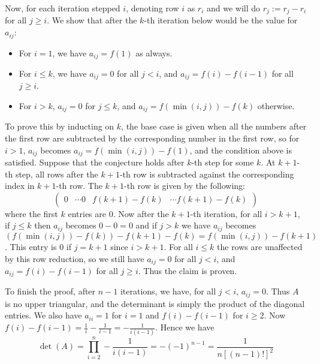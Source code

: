 \documentclass[11pt,a4paper]{article}
\begin{document}
\begin{enumerate}
	Now, for each iteration stepped $i$, denoting row $i$ as $r_i$ and we will do $r_{j}:=r_{j}-r_i$ for all $j\ge i$. We show that after the $k$-th iteration below would be the value for $a_{ij}$: 
	\begin{itemize}
		\item For $i=1$, we have $a_{ij}=f(1)$ as always. 
		\item For $i\le k$, we have $a_{ij}=0$ for all $j<i$, and $a_{ij}=f(i)-f(i-1)$ for all $j\ge i$. 
		\item For $i>k$, $a_{ij}=0$ for $j\le k$, and $a_{ij}=f(\min(i, j))-f(k)$ otherwise. 
	\end{itemize}
    To prove this by inducting on $k$, the base case is given when all the numbers after the first row are subtracted by the corresponding number in the first row, so for $i>1$, $a_{ij}$ becomes $a_{ij}=f(\min(i, j))-f(1)$, and the condition above is satisfied. Suppose that the conjecture holds after $k$-th step for some $k$. At $k+1$-th step, all rows after the $k+1$-th row is subtracted against the corresponding index in $k+1$-th row. The $k+1$-th row is given by the following: 
    \[\begin{pmatrix}0 & \cdots 0 & f(k+1)-f(k) & \cdots f(k+1)-f(k)\end{pmatrix}\]
    where the first $k$ entries are 0. Now after the $k+1$-th iteration, for all $i>k+1$, if $j\le k$ then $a_{ij}$ becomes $0-0=0$ and if $j>k$ we have $a_{ij}$ becomes $(f(\min(i, j))-f(k))-f(k+1)-f(k)=f(\min(i, j))-f(k+1)$. This entry is 0 if $j=k+1$ since $i>k+1$. For all $i\le k$ the rows are unaffected by this row reduction, so we still have $a_{ij}=0$ for all $j<i$, and $a_{ij}=f(i)-f(i-1)$ for all $j\ge i$. Thus the claim is proven. 
    
    To finish the proof, after $n-1$ iterations, we have, for all $j<i$, $a_{ij}=0$. Thus $A$ is no upper triangular, and the determinant is simply the product of the diagonal entries. We also have $a_{ii}=1$ for $i=1$ and $f(i)-f(i-1)$ for $i\ge 2$. Now $f(i)-f(i-1)=\frac{1}{i}-\frac{1}{i-1}=-\frac{1}{i(i-1)}$. Hence we have 
    \[\det(A)=\prod_{i=2}^n -\frac{1}{i(i-1)}= - (-1)^{n-1}=\frac{1}{n[(n-1)!]^2}\]
\end{enumerate}
\end{document}
